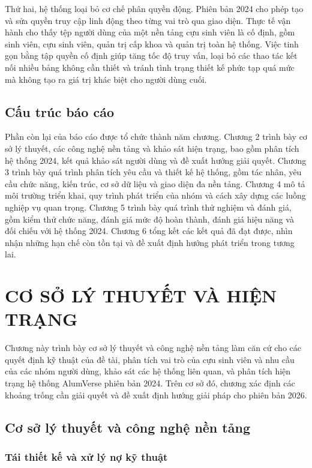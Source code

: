 \documentclass[12pt,a4paper,oneside]{report}
\begin{document}
Thứ hai, hệ thống loại bỏ cơ chế phân quyền động. Phiên bản 2024 cho phép tạo và sửa quyền truy cập linh động theo từng vai trò qua giao diện. Thực tế vận hành cho thấy tệp người dùng của một nền tảng cựu sinh viên là cố định, gồm sinh viên, cựu sinh viên, quản trị cấp khoa và quản trị toàn hệ thống. Việc tinh gọn bằng tập quyền cố định giúp tăng tốc độ truy vấn, loại bỏ các thao tác kết nối nhiều bảng không cần thiết và tránh tình trạng thiết kế phức tạp quá mức mà không tạo ra giá trị khác biệt cho người dùng cuối.

\section{Cấu trúc báo cáo}

Phần còn lại của báo cáo được tổ chức thành năm chương. Chương 2 trình bày cơ sở lý thuyết, các công nghệ nền tảng và khảo sát hiện trạng, bao gồm phân tích hệ thống 2024, kết quả khảo sát người dùng và đề xuất hướng giải quyết. Chương 3 trình bày quá trình phân tích yêu cầu và thiết kế hệ thống, gồm tác nhân, yêu cầu chức năng, kiến trúc, cơ sở dữ liệu và giao diện đa nền tảng. Chương 4 mô tả môi trường triển khai, quy trình phát triển của nhóm và cách xây dựng các luồng nghiệp vụ quan trọng. Chương 5 trình bày quá trình thử nghiệm và đánh giá, gồm kiểm thử chức năng, đánh giá mức độ hoàn thành, đánh giá hiệu năng và đối chiếu với hệ thống 2024. Chương 6 tổng kết các kết quả đã đạt được, nhìn nhận những hạn chế còn tồn tại và đề xuất định hướng phát triển trong tương lai.

\chapter{CƠ SỞ LÝ THUYẾT VÀ HIỆN TRẠNG}

Chương này trình bày cơ sở lý thuyết và công nghệ nền tảng làm căn cứ cho các quyết định kỹ thuật của đề tài, phân tích vai trò của cựu sinh viên và nhu cầu của các nhóm người dùng, khảo sát các hệ thống liên quan, và phân tích hiện trạng hệ thống AlumVerse phiên bản 2024. Trên cơ sở đó, chương xác định các khoảng trống cần giải quyết và đề xuất định hướng giải pháp cho phiên bản 2026.

\section{Cơ sở lý thuyết và công nghệ nền tảng}

\subsection{Tái thiết kế và xử lý nợ kỹ thuật}
\end{document}

